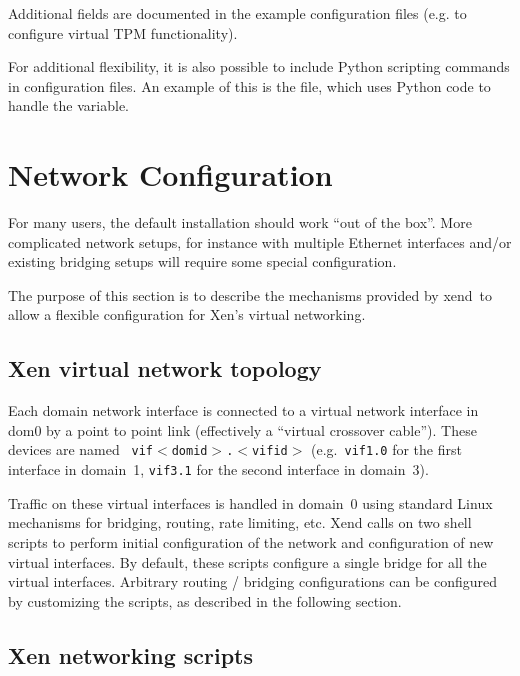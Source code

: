 \documentclass[11pt,twoside,final,openright]{report}
\def\xend{{xend}\xspace}
\begin{document}
Additional fields are documented in the example configuration files 
(e.g. to configure virtual TPM functionality). 

For additional flexibility, it is also possible to include Python
scripting commands in configuration files.  An example of this is the
 file, which uses Python code to handle the
 variable.




\section{Network Configuration}

For many users, the default installation should work ``out of the
box''.  More complicated network setups, for instance with multiple
Ethernet interfaces and/or existing bridging setups will require some
special configuration.

The purpose of this section is to describe the mechanisms provided by
\xend\ to allow a flexible configuration for Xen's virtual networking.

\subsection{Xen virtual network topology}

Each domain network interface is connected to a virtual network
interface in dom0 by a point to point link (effectively a ``virtual
crossover cable'').  These devices are named {\tt
  vif$<$domid$>$.$<$vifid$>$} (e.g.\ {\tt vif1.0} for the first
interface in domain~1, {\tt vif3.1} for the second interface in
domain~3).

Traffic on these virtual interfaces is handled in domain~0 using
standard Linux mechanisms for bridging, routing, rate limiting, etc.
Xend calls on two shell scripts to perform initial configuration of
the network and configuration of new virtual interfaces.  By default,
these scripts configure a single bridge for all the virtual
interfaces.  Arbitrary routing / bridging configurations can be
configured by customizing the scripts, as described in the following
section.

\subsection{Xen networking scripts}
\end{document}
